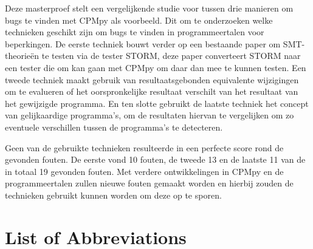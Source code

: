 \documentclass[master=cws, masteroption=se, english, oneside]{kulemt} %
\begin{document}
\begin{abstract*}
		Deze masterproef stelt een vergelijkende studie voor tussen drie manieren om bugs te vinden met CPMpy als voorbeeld. Dit om te onderzoeken welke technieken geschikt zijn om bugs te vinden in programmeertalen voor beperkingen.
		De eerste techniek bouwt verder op een bestaande paper om SMT-theorieën te testen via de tester STORM, deze paper converteert STORM naar een tester die om kan gaan met CPMpy om daar dan mee te kunnen testen.
		Een tweede techniek maakt gebruik van resultaatsgebonden equivalente wijzigingen om te evalueren of het oorspronkelijke resultaat verschilt van het resultaat van het gewijzigde programma. En ten slotte gebruikt de laatste techniek het concept van gelijkaardige programma's, om de resultaten hiervan te vergelijken om zo eventuele verschillen tussen de programma's te detecteren.
		
		Geen van de gebruikte technieken resulteerde in een perfecte score rond de gevonden fouten. De eerste vond 10 fouten, de tweede 13 en de laatste 11 van de in totaal 19 gevonden fouten. Met verdere ontwikkelingen in CPMpy en de programmeertalen zullen nieuwe fouten gemaakt worden en hierbij zouden de technieken gebruikt kunnen worden om deze op te sporen.
		
		
	\end{abstract*}



\listoffigures
\listoftables
\lstlistoflistings
\chapter{List of Abbreviations}
\end{document}
